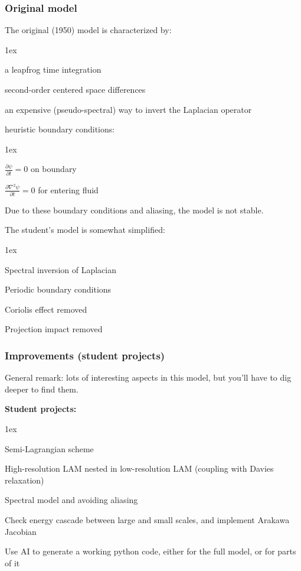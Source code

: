 \documentclass[aspectratio=149,9pt]{beamer}
\begin{document}
%
%
\begin{frame}
	\frametitle{Original model}
	The original (1950) model is characterized by:
	\begin{myitemize}{1ex}
		\item a leapfrog time integration
		\item second-order centered space differences
		\item an expensive (pseudo-spectral) way to invert the Laplacian operator
		\item heuristic boundary conditions:
			\begin{myitemize}{1ex}
				\item $\frac{\partial \psi}{\partial t}=0$ on boundary
				\item $\frac{\partial \nabla^2 \psi}{\partial t}=0$ for entering fluid
			\end{myitemize}
	\end{myitemize}
	Due to these boundary conditions and aliasing, the model is not stable.
	\par\vspace*{4ex}
	The student's model is somewhat simplified:
	\begin{myitemize}{1ex}
		\item Spectral inversion of Laplacian
		\item Periodic boundary conditions
		\item Coriolis effect removed
		\item Projection impact removed
	\end{myitemize}
\end{frame}
%
%
\begin{frame}
	\frametitle{Improvements (student projects)}
	General remark: lots of interesting aspects in this model, but you'll have to dig deeper to find them.
	\par\vspace*{4ex}
	{\bf Student projects:}
	\begin{myitemize}{1ex}
		\item[7.] Semi-Lagrangian scheme
		\item[8.] High-resolution LAM nested in low-resolution LAM (coupling with Davies relaxation)
		\item[9.] Spectral model and avoiding aliasing
		\item[10.] Check energy cascade between large and small scales, and implement Arakawa Jacobian
		\item[11.] Use AI to generate a working python code, either for the full model, or for parts of it
	\end{myitemize}
\end{frame}
\end{document}
